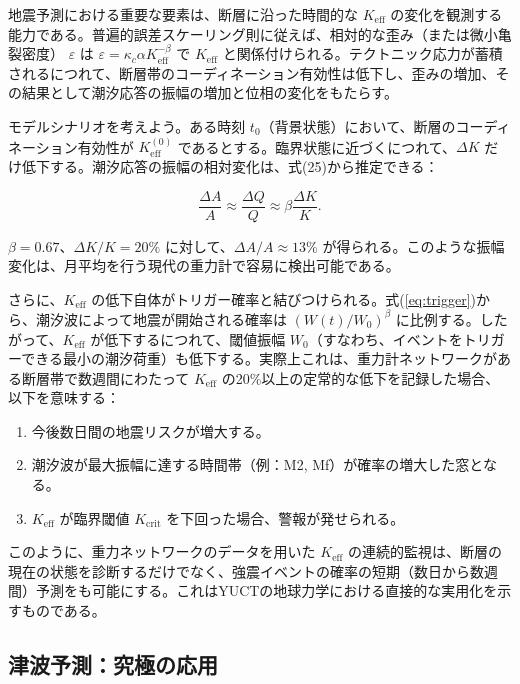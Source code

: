 \documentclass[12pt,a4paper]{article}
\theoremstyle{remark}
\begin{document}
	地震予測における重要な要素は、断層に沿った時間的な \(K_{\mathrm{eff}}\) の変化を観測する能力である。普遍的誤差スケーリング則に従えば、相対的な歪み（または微小亀裂密度） \(\varepsilon\) は \(\varepsilon = \kappa_c \alpha K_{\mathrm{eff}}^{-\beta}\) で \(K_{\mathrm{eff}}\) と関係付けられる。テクトニック応力が蓄積されるにつれて、断層帯のコーディネーション有効性は低下し、歪みの増加、その結果として潮汐応答の振幅の増加と位相の変化をもたらす。
	
	モデルシナリオを考えよう。ある時刻 \(t_0\)（背景状態）において、断層のコーディネーション有効性が \(K_{\mathrm{eff}}^{(0)}\) であるとする。臨界状態に近づくにつれて、\(\Delta K\) だけ低下する。潮汐応答の振幅の相対変化は、式(25)から推定できる：
	
	\[
	\frac{\Delta A}{A} \approx \frac{\Delta Q}{Q} \approx \beta \frac{\Delta K}{K}.
	\]
	
	\(\beta = 0.67\)、\(\Delta K/K = 20\%\) に対して、\(\Delta A/A \approx 13\%\) が得られる。このような振幅変化は、月平均を行う現代の重力計で容易に検出可能である。
	
	さらに、\(K_{\mathrm{eff}}\) の低下自体がトリガー確率と結びつけられる。式(\ref{eq:trigger})から、潮汐波によって地震が開始される確率は \((W(t)/W_0)^{\beta}\) に比例する。したがって、\(K_{\mathrm{eff}}\) が低下するにつれて、閾値振幅 \(W_0\)（すなわち、イベントをトリガーできる最小の潮汐荷重）も低下する。実際上これは、重力計ネットワークがある断層帯で数週間にわたって \(K_{\mathrm{eff}}\) の20\%以上の定常的な低下を記録した場合、以下を意味する：
	
	\begin{enumerate}
		\item 今後数日間の地震リスクが増大する。
		\item 潮汐波が最大振幅に達する時間帯（例：M2, Mf）が確率の増大した窓となる。
		\item \(K_{\mathrm{eff}}\) が臨界閾値 \(K_{\text{crit}}\) を下回った場合、警報が発せられる。
	\end{enumerate}
	
	このように、重力ネットワークのデータを用いた \(K_{\mathrm{eff}}\) の連続的監視は、断層の現在の状態を診断するだけでなく、強震イベントの確率の短期（数日から数週間）予測をも可能にする。これはYUCTの地球力学における直接的な実用化を示すものである。
	
	\subsection{津波予測：究極の応用}
	\label{sec:tsunami}
	
\end{document}
